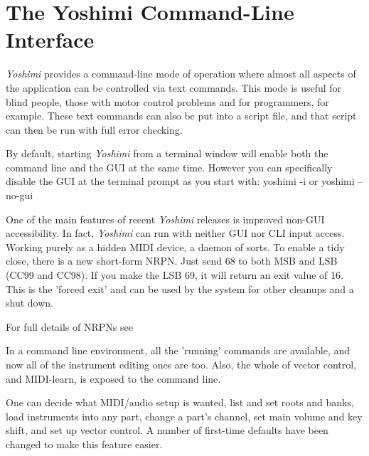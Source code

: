 %
%
%

\section{The Yoshimi Command-Line Interface}
\label{sec:command_line}

   \textsl{Yoshimi} provides a command-line mode of operation where almost
   all aspects of the application can be controlled via text commands. This
   mode is useful for blind people, those with motor control problems and for
   programmers, for example. These text commands can also be put into a
   script file, and that script can then be run with full error checking.

   By default, starting \textsl{Yoshimi} from a terminal window will enable
   both the command line and the GUI at the same time. However you can
   specifically disable the GUI at the terminal prompt as you start with:
   yoshimi -i or yoshimi --no-gui

   One of the main features of recent \textsl{Yoshimi} releases
   is improved non-GUI accessibility.  In fact,
   \textsl{Yoshimi} can run with neither GUI nor CLI input access. Working
   purely as a hidden MIDI device, a daemon of sorts. To enable a tidy close,
   there is a new short-form NRPN. Just send 68 to both MSB and LSB (CC99 and
   CC98). If you make the LSB 69, it will return an exit value of 16. This is
   the 'forced exit' and can be used by the system for other cleanups and a
   shut down.

   For full details of NRPNs see

   In a command line environment, all the 'running' commands are available,
   and now all of the instrument editing ones are too. Also, the whole of
   vector control, and MIDI-learn, is exposed to the command line.

   One can decide what MIDI/audio setup is wanted, list and set roots and
   banks, load instruments into any part, change a part's channel, set main
   volume and key shift, and set up vector control.  A number of first-time
   defaults have been changed to make this feature easier.

